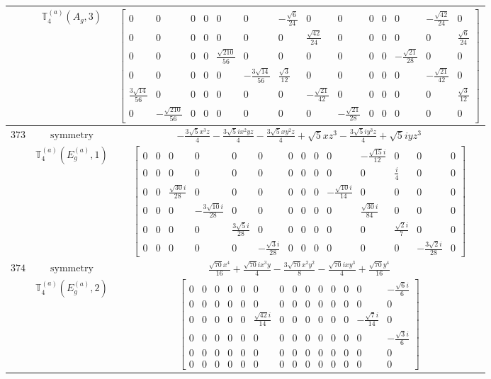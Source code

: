 \documentclass[fleqn,8pt,landscape]{jsarticle}
\begin{document}
\begin{longtable}{ccc}
$  $ & $ \mathbb{T}_{4}^{(a)}(A_{g},3) $ & $ \begin{bmatrix} 0 & 0 & 0 & 0 & 0 & 0 & - \frac{\sqrt{6}}{24} & 0 & 0 & 0 & 0 & 0 & - \frac{\sqrt{42}}{24} & 0 \\ 0 & 0 & 0 & 0 & 0 & 0 & 0 & \frac{\sqrt{42}}{24} & 0 & 0 & 0 & 0 & 0 & \frac{\sqrt{6}}{24} \\ 0 & 0 & 0 & 0 & \frac{\sqrt{210}}{56} & 0 & 0 & 0 & 0 & 0 & 0 & - \frac{\sqrt{21}}{28} & 0 & 0 \\ 0 & 0 & 0 & 0 & 0 & - \frac{3 \sqrt{14}}{56} & \frac{\sqrt{3}}{12} & 0 & 0 & 0 & 0 & 0 & - \frac{\sqrt{21}}{42} & 0 \\ \frac{3 \sqrt{14}}{56} & 0 & 0 & 0 & 0 & 0 & 0 & - \frac{\sqrt{21}}{42} & 0 & 0 & 0 & 0 & 0 & \frac{\sqrt{3}}{12} \\ 0 & - \frac{\sqrt{210}}{56} & 0 & 0 & 0 & 0 & 0 & 0 & - \frac{\sqrt{21}}{28} & 0 & 0 & 0 & 0 & 0 \end{bmatrix} $ \\ \hline
$ 373 $ & $ \text{symmetry} $ & $ - \frac{3 \sqrt{5} x^{3} z}{4} - \frac{3 \sqrt{5} i x^{2} y z}{4} - \frac{3 \sqrt{5} x y^{2} z}{4} + \sqrt{5} x z^{3} - \frac{3 \sqrt{5} i y^{3} z}{4} + \sqrt{5} i y z^{3} $ \\
$  $ & $ \mathbb{T}_{4}^{(a)}(E_{g}^{(a)},1) $ & $ \begin{bmatrix} 0 & 0 & 0 & 0 & 0 & 0 & 0 & 0 & 0 & 0 & - \frac{\sqrt{15} i}{12} & 0 & 0 & 0 \\ 0 & 0 & 0 & 0 & 0 & 0 & 0 & 0 & 0 & 0 & 0 & \frac{i}{4} & 0 & 0 \\ 0 & 0 & \frac{\sqrt{30} i}{28} & 0 & 0 & 0 & 0 & 0 & 0 & - \frac{\sqrt{10} i}{14} & 0 & 0 & 0 & 0 \\ 0 & 0 & 0 & - \frac{3 \sqrt{10} i}{28} & 0 & 0 & 0 & 0 & 0 & 0 & \frac{\sqrt{30} i}{84} & 0 & 0 & 0 \\ 0 & 0 & 0 & 0 & \frac{3 \sqrt{5} i}{28} & 0 & 0 & 0 & 0 & 0 & 0 & \frac{\sqrt{2} i}{7} & 0 & 0 \\ 0 & 0 & 0 & 0 & 0 & - \frac{\sqrt{3} i}{28} & 0 & 0 & 0 & 0 & 0 & 0 & - \frac{3 \sqrt{2} i}{28} & 0 \end{bmatrix} $ \\ \hline
$ 374 $ & $ \text{symmetry} $ & $ \frac{\sqrt{70} x^{4}}{16} + \frac{\sqrt{70} i x^{3} y}{4} - \frac{3 \sqrt{70} x^{2} y^{2}}{8} - \frac{\sqrt{70} i x y^{3}}{4} + \frac{\sqrt{70} y^{4}}{16} $ \\
$  $ & $ \mathbb{T}_{4}^{(a)}(E_{g}^{(a)},2) $ & $ \begin{bmatrix} 0 & 0 & 0 & 0 & 0 & 0 & 0 & 0 & 0 & 0 & 0 & 0 & 0 & - \frac{\sqrt{6} i}{6} \\ 0 & 0 & 0 & 0 & 0 & 0 & 0 & 0 & 0 & 0 & 0 & 0 & 0 & 0 \\ 0 & 0 & 0 & 0 & 0 & \frac{\sqrt{42} i}{14} & 0 & 0 & 0 & 0 & 0 & 0 & - \frac{\sqrt{7} i}{14} & 0 \\ 0 & 0 & 0 & 0 & 0 & 0 & 0 & 0 & 0 & 0 & 0 & 0 & 0 & - \frac{\sqrt{3} i}{6} \\ 0 & 0 & 0 & 0 & 0 & 0 & 0 & 0 & 0 & 0 & 0 & 0 & 0 & 0 \\ 0 & 0 & 0 & 0 & 0 & 0 & 0 & 0 & 0 & 0 & 0 & 0 & 0 & 0 \end{bmatrix} $ \\ \hline

\end{longtable}
\end{document}
